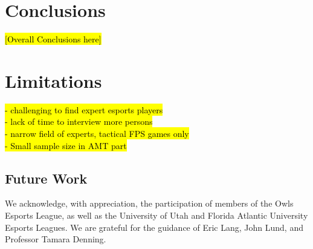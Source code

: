 \documentclass[11pt,manuscript,screen,review]{acmart} %
\begin{document}
\section{Conclusions}

\hl{[Overall Conclusions here]}

\section{Limitations}

\hl{
- challenging to find expert esports players \\
- lack of time to interview more persons \\
- narrow field of experts, tactical FPS games only\\
- Small sample size in AMT part}

\subsection{Future Work}

\begin{acks} 
    We acknowledge, with appreciation, the participation of members of the Owls Esports League, as well as the University of Utah and Florida Atlantic University Esports Leagues. We are grateful for the guidance of Eric Lang, John Lund, and Professor Tamara Denning. 
\end{acks}



\end{document}
